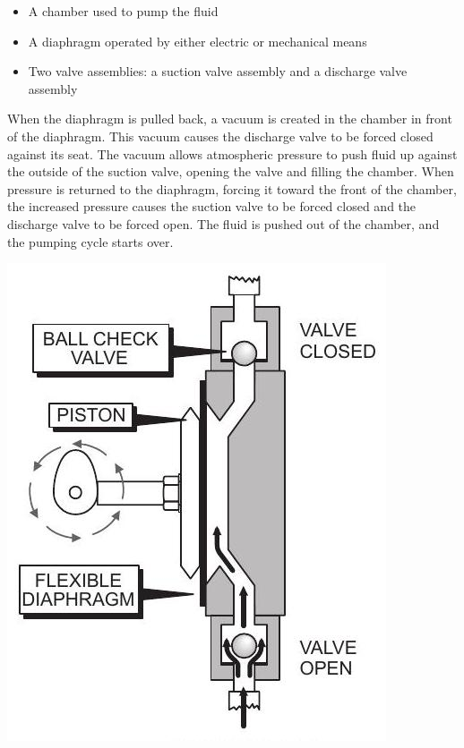 \documentclass[10pt]{article}
\begin{document}
\begin{itemize}
  \item A chamber used to pump the fluid

  \item A diaphragm operated by either electric or mechanical means

  \item Two valve assemblies: a suction valve assembly and a discharge valve assembly

\end{itemize}
When the diaphragm is pulled back, a vacuum is created in the chamber in front of the diaphragm. This vacuum causes the discharge valve to be forced closed against its seat. The vacuum allows atmospheric pressure to push fluid up against the outside of the suction valve, opening the valve and filling the chamber. When pressure is returned to the diaphragm, forcing it toward the front of the chamber, the increased pressure causes the suction valve to be forced closed and the discharge valve to be forced open. The fluid is pushed out of the chamber, and the pumping cycle starts over.

\includegraphics[max width=\textwidth]{DiaphragmPumpSuctionPhase}
\end{document}
